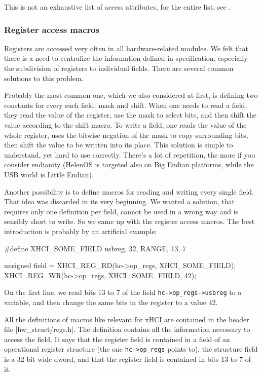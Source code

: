 This is not an exhaustive list of access attributes, for the entire list, see .

\subsubsection{Register access macros}

Registers are accessed very often in all hardware-related modules. We felt that
there is a need to centralize the information defined in specification,
especially the subdivision of registers to individual fields. There are several
common solutions to this problem.

Probably the most common one, which we also considered at first, is defining
two constants for every such field: mask and shift. When one needs to read
a field, they read the value of the register, use the mask to select bits, and
then shift the value according to the shift macro. To write a field, one reads
the value of the whole register, uses the bitwise negation of the mask to copy
surrounding bits, then shift the value to be written into its place. This
solution is simple to understand, yet hard to use correctly. There's a lot of
repetition, the more if you consider endianity (HelenOS is targeted also on Big
Endian platforms, while the USB world is Little Endian).

Another possibility is to define macros for reading and writing every single
field. That idea was discarded in its very beginning. We wanted a solution,
that requires only one definition per field, cannot be used in a wrong way and
is sensibly short to write. So we came up with the register access macros. The
best introduction is probably by an artificial example:

\begin{listing}[h]
\begin{code}
#define XHCI_SOME_FIELD            usbreg, 32, RANGE, 13, 7

unsigned field = XHCI_REG_RD(hc->op_regs, XHCI_SOME_FIELD);
XHCI_REG_WR(hc->op_regs, XHCI_SOME_FIELD, 42);
\end{code}
	\caption[An example of using register macros]{On the first line, we read
	bits 13 to 7 of the field \texttt{hc->op_regs->usbreg} to
	a variable, and then change the same bits in the register to a value 42.}
\end{listing}

All the definitions of macros like  relevant for xHCI
are contained in the header file \header|hw_struct/regs.h|. The definition
contains all the information necessary to access the field. It says that the
register field is contained in a field  of an operational
register structure (the one \texttt{hc->op_regs} points to), the
structure field is a 32 bit wide dword, and that the register field is
contained in bits 13 to 7 of it.

